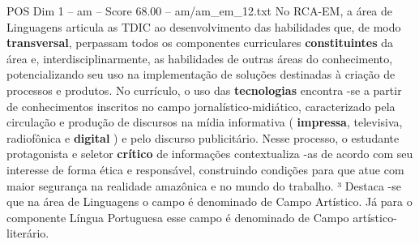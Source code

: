 \begin{textsample}{POS Dim 1 – am – Score 68.00 – am/am\_em\_12.txt}
No RCA-EM, a área de Linguagens articula as TDIC ao desenvolvimento das habilidades que, de modo \textbf{transversal}, perpassam todos os componentes curriculares \textbf{constituintes} da área e, interdisciplinarmente, as habilidades de outras áreas do conhecimento, potencializando seu uso na implementação de soluções destinadas à criação de processos e produtos.
No currículo, o uso das \textbf{tecnologias} encontra -se a partir de conhecimentos inscritos no campo jornalístico-midiático, caracterizado pela circulação e produção de discursos na mídia informativa ( \textbf{impressa}, televisiva, radiofônica e \textbf{digital} ) e pelo discurso publicitário.
Nesse processo, o estudante protagonista e seletor \textbf{crítico} de informações contextualiza -as de acordo com seu interesse de forma ética e responsável, construindo condições para que atue com maior segurança na realidade amazônica e no mundo do trabalho. ³ Destaca -se que na área de Linguagens o campo é denominado de Campo Artístico.
Já para o componente Língua Portuguesa esse campo é denominado de Campo artístico-literário.

\end{textsample}
